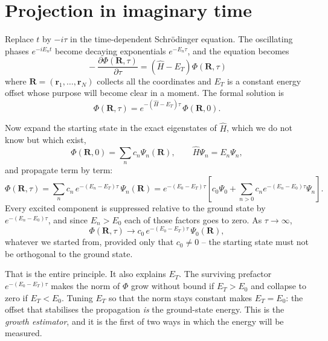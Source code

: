 \section{Projection in imaginary time}
\label{sec:dmcprojection}

Replace $t$ by $-i\tau$ in the time-dependent Schr\"odinger equation.  The
oscillating phases $e^{-iE_nt}$ become decaying exponentials $e^{-E_n\tau}$,
and the equation becomes
\begin{equation}
  \boxed{\;
  -\frac{\partial \Phi(\bm{R},\tau)}{\partial \tau}
   = \left(\hat{H} - E_T\right)\Phi(\bm{R},\tau) \;}
  \label{eq:15-imaginarytime}
\end{equation}
where $\bm{R}=(\bm{r}_1,\dots,\bm{r}_N)$ collects all the coordinates and
$E_T$ is a constant energy offset whose purpose will become clear in a moment.
The formal solution is
\begin{equation}
  \Phi(\bm{R},\tau)
   = e^{-\left(\hat{H}-E_T\right)\tau}\,\Phi(\bm{R},0).
  \label{eq:15-formalsolution}
\end{equation}

Now expand the starting state in the exact eigenstates of $\hat{H}$, which we
do not know but which exist,
\begin{equation}
  \Phi(\bm{R},0) = \sum_{n} c_n \Psi_n(\bm{R}),
  \qquad \hat{H}\Psi_n = E_n\Psi_n ,
  \label{eq:15-expansion}
\end{equation}
and propagate term by term:
\begin{equation}
  \Phi(\bm{R},\tau)
   = \sum_n c_n\,e^{-(E_n-E_T)\tau}\,\Psi_n(\bm{R})
   = e^{-(E_0-E_T)\tau}
     \left[c_0\Psi_0 + \sum_{n>0}c_n e^{-(E_n-E_0)\tau}\Psi_n\right].
  \label{eq:15-filtering}
\end{equation}
Every excited component is suppressed relative to the ground state by
$e^{-(E_n-E_0)\tau}$, and since $E_n>E_0$ each of those factors goes to zero.
As $\tau\to\infty$,
\begin{equation}
  \Phi(\bm{R},\tau) \longrightarrow c_0\,e^{-(E_0-E_T)\tau}\,\Psi_0(\bm{R}) ,
  \label{eq:15-limit}
\end{equation}
whatever we started from, provided only that $c_0\ne0$ -- the starting state
must not be orthogonal to the ground state.

That is the entire principle.  It also explains $E_T$.  The surviving
prefactor $e^{-(E_0-E_T)\tau}$ makes the norm of $\Phi$ grow without bound if
$E_T>E_0$ and collapse to zero if $E_T<E_0$.  Tuning $E_T$ so that the norm
stays constant makes $E_T=E_0$: the offset that stabilises the propagation
\emph{is} the ground-state energy.  This is the \emph{growth estimator}, and
it is the first of two ways in which the energy will be measured.

